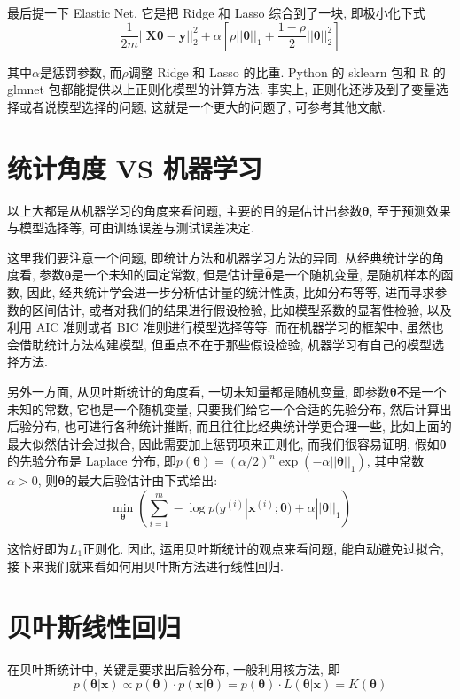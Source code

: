 \documentclass[a4paper,UTF8]{ctexart}
\theoremstyle{plain} \newtheorem{theorem}{定理}[section]
\theoremstyle{plain} \newtheorem{definition}{定义}[section]
\theoremstyle{plain} \newtheorem{lemma}{引理}[section]
\theoremstyle{plain} \newtheorem{proposition}{命题}[section]
\theoremstyle{plain} \newtheorem{example}{例}[section]
\theoremstyle{plain} \newtheorem{remark}{注}[section]
\theoremstyle{plain} \newtheorem{corollary}{推论}[section]
\begin{document}
最后提一下 Elastic Net, 它是把 Ridge 和 Lasso 综合到了一块, 即极小化下式
\begin{equation*}
\frac{1}{2m} ||\bm{X} \bm{\theta} - \bm{y}||_{2}^{2} + \alpha \left[ \rho ||\bm{\theta}||_{1} + \frac{1 - \rho}{2} ||\bm{\theta}||_{2}^{2}  \right] 
\end{equation*}
  
其中$\alpha$是惩罚参数, 而$\rho$调整 Ridge 和 Lasso 的比重. Python 的 sklearn 包和 R 的 glmnet 包都能提供以上正则化模型的计算方法. 事实上, 正则化还涉及到了变量选择或者说模型选择的问题, 这就是一个更大的问题了, 可参考其他文献.



\section{统计角度 VS 机器学习}
以上大都是从机器学习的角度来看问题, 主要的目的是估计出参数$\bm{\theta}$, 至于预测效果与模型选择等, 可由训练误差与测试误差决定.

这里我们要注意一个问题, 即统计方法和机器学习方法的异同. 从经典统计学的角度看, 参数$\bm{\theta}$是一个未知的固定常数, 但是估计量$\hat{\bm{\theta}}$是一个随机变量, 是随机样本的函数, 因此, 经典统计学会进一步分析估计量的统计性质, 比如分布等等, 进而寻求参数的区间估计, 或者对我们的结果进行假设检验, 比如模型系数的显著性检验, 以及利用 AIC 准则或者 BIC 准则进行模型选择等等. 而在机器学习的框架中, 虽然也会借助统计方法构建模型, 但重点不在于那些假设检验, 机器学习有自己的模型选择方法.

另外一方面, 从贝叶斯统计的角度看, 一切未知量都是随机变量, 即参数$\bm{\theta}$不是一个未知的常数, 它也是一个随机变量, 只要我们给它一个合适的先验分布, 然后计算出后验分布, 也可进行各种统计推断, 而且往往比经典统计学更合理一些, 比如上面的最大似然估计会过拟合, 因此需要加上惩罚项来正则化, 而我们很容易证明, 假如$\bm{\theta}$的先验分布是 Laplace 分布, 即$p(\bm{\theta})  = (\alpha / 2)^{n} \exp (-\alpha ||\bm{\theta}||_{1})$, 其中常数$\alpha > 0$, 则$\bm{\theta}$的最大后验估计由下式给出:
\begin{equation*}
\min_{\bm{\theta}} \left( \sum_{i=1}^{m} - \log p(y^{(i)}|\bm{x}^{(i)};\bm{\theta}) + \alpha ||\bm{\theta}||_{1} \right)
\end{equation*}

这恰好即为$L_{1}$正则化. 因此, 运用贝叶斯统计的观点来看问题, 能自动避免过拟合, 接下来我们就来看如何用贝叶斯方法进行线性回归.



\section{贝叶斯线性回归}
在贝叶斯统计中, 关键是要求出后验分布, 一般利用核方法, 即
\begin{equation*}
p(\bm{\theta} | \bm{x}) \propto p(\bm{\theta}) \cdot p(\bm{x} | \bm{\theta}) = p(\bm{\theta}) \cdot L(\bm{\theta} | \bm{x}) = K(\bm{\theta})
\end{equation*}
\end{document}
